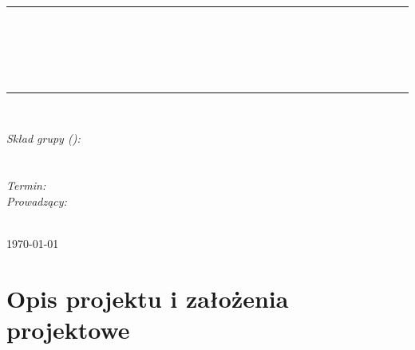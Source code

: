 \documentclass[10pt, a4paper]{article}
\begin{document}
\def\tablename{Tabela}	%

\begin{titlepage}
	\begin{center}
		\textsc{\LARGE \formakursu}\\[1cm]		
		\textsc{\Large \kurs}\\[0.5cm]		
		\rule{\textwidth}{0.08cm}\\[0.4cm]
		{\huge \bfseries \doctype}\\[1cm]
		{\huge \bfseries \projectname}\\[0.5cm]
		{\huge \bfseries \acronim}\\[0.4cm]
		\rule{\textwidth}{0.08cm}\\[1cm]
		
		\begin{flushright} \large
		\emph{Skład grupy (\nrgrupy):}\\
		\osobaA\\
		\osobaB\\[0.4cm]
		
		\emph{Termin: }\termin\\[0.4cm]

		\emph{Prowadzący:} \\
		\prowadzacy \\
		
		\end{flushright}
		
		\vfill
		
		{\large \today}
	\end{center}	
\end{titlepage}

\newpage
\tableofcontents
\newpage

	\section{Opis projektu i założenia projektowe}
\end{document}
